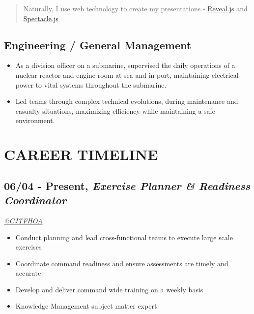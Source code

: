 \documentclass[10pt]{article}
\def\tightlist{}
\begin{document}
\begin{quote}
Naturally, I use web technology to create my presentations -
\href{https://revealjs.com/\#/}{Reveal.js} and
\href{https://formidable.com/open-source/spectacle/}{Spectacle.js}
\end{quote}

\subsection{Engineering / General
Management}\label{engineering-general-management}

\begin{itemize}
\tightlist
\item
  As a division officer on a submarine, supervised the daily operations
  of a nuclear reactor and engine room at sea and in port, maintaining
  electrical power to vital systems throughout the submarine.
\item
  Led teams through complex technical evolutions, during maintenance and
  casualty situations, maximizing efficiency while maintaining a safe
  environment.
\end{itemize}

\section{CAREER TIMELINE}\label{career-timeline}

\subsection{\texorpdfstring{06/04 - Present, \textbf{\emph{Exercise
Planner \& Readiness
Coordinator}}}{06/04 - Present, Exercise Planner \& Readiness Coordinator}}\label{present-exercise-planner-readiness-coordinator}

\emph{\href{https://twitter.com/CJTFHOA}{@CJTFHOA}}

\begin{itemize}
\tightlist
\item
  Conduct planning and lead cross-functional teams to execute large
  scale exercises
\item
  Coordinate command readiness and ensure assessments are timely and
  accurate
\item
  Develop and deliver command wide training on a weekly basis
\item
  Knowledge Management subject matter expert
\end{itemize}
\end{document}
